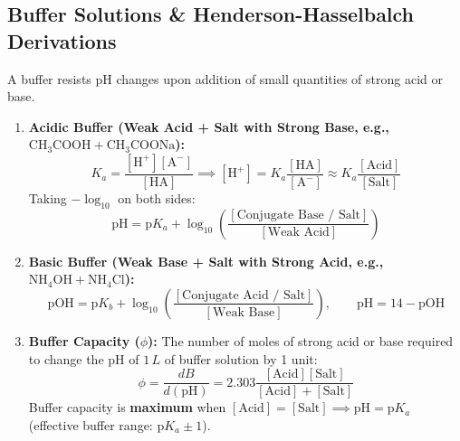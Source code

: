 \documentclass[10pt,a4paper]{article}
\begin{document}
\subsection{Buffer Solutions \& Henderson-Hasselbalch Derivations}
A buffer resists pH changes upon addition of small quantities of strong acid or base.
\begin{enumerate}
  \item \textbf{Acidic Buffer (Weak Acid + Salt with Strong Base, e.g., $\mathrm{CH_3COOH + CH_3COONa}$):}
  \begin{equation}
    K_a = \frac{[\mathrm{H}^+][\mathrm{A}^-]}{[\mathrm{HA}]} \implies [\mathrm{H}^+] = K_a \frac{[\mathrm{HA}]}{[\mathrm{A}^-]} \approx K_a \frac{[\text{Acid}]}{[\text{Salt}]}
  \end{equation}
  Taking $-\log_{10}$ on both sides:
  \begin{equation}
    \text{pH} = \text{p}K_a + \log_{10}\left(\frac{[\text{Conjugate Base / Salt}]}{[\text{Weak Acid}]}\right)
  \end{equation}
  \item \textbf{Basic Buffer (Weak Base + Salt with Strong Acid, e.g., $\mathrm{NH_4OH + NH_4Cl}$):}
  \begin{equation}
    \text{pOH} = \text{p}K_b + \log_{10}\left(\frac{[\text{Conjugate Acid / Salt}]}{[\text{Weak Base}]}\right), \qquad \text{pH} = 14 - \text{pOH}
  \end{equation}
  \item \textbf{Buffer Capacity ($\phi$):} The number of moles of strong acid or base required to change the pH of $1\,\si{L}$ of buffer solution by 1 unit:
  \begin{equation}
    \phi = \frac{d B}{d(\text{pH})} = 2.303 \frac{[\text{Acid}][\text{Salt}]}{[\text{Acid}] + [\text{Salt}]}
  \end{equation}
  Buffer capacity is \textbf{maximum} when $[\text{Acid}] = [\text{Salt}] \implies \text{pH} = \text{p}K_a$ (effective buffer range: $\text{p}K_a \pm 1$).
\end{enumerate}
\end{document}
